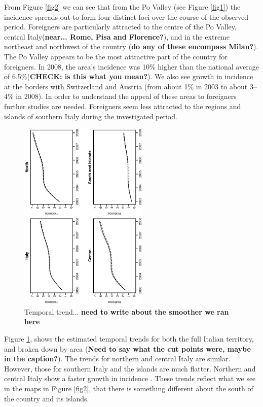\documentclass[10pt]{article}
\theoremstyle{definition}
\theoremstyle{plain}
\begin{document}
From Figure \ref{fig2} we can see that from the Po Valley (see Figure \ref{fig1}) the incidence spreads out to form four distinct foci over the course of the observed period. Foreigners are particularly attracted to the centre of the Po Valley, central Italy(\textbf{near... Rome, Pisa and Florence?}), and in the extreme northeast and northwest of the country (\textbf{do any of these encompass Milan?}). The Po Valley appears to be the most attractive part of the country for foreigners. In 2008, the area's incidence was 10\% higher than the national average of 6.5\%(\textbf{CHECK: is this what you mean?}). We also see growth in incidence at the borders with Switzerland and Austria (from about 1\% in 2003 to about 3--4\% in 2008). In order to understand the appeal of these areas to foreigners further studies are needed. Foreigners seem less attracted to the regions and islands of southern Italy during the investigated period.

\begin{figure}[tbp]
	\centering
		\includegraphics[width=0.55\textwidth, angle=270]{trends.ps}
	\caption{Temporal trend... \textbf{need to write about the smoother we ran here}}
	\label{trends}
\end{figure}

Figure \ref{trends}, shows the estimated temporal trends for both the full Italian territory, and broken down by area (\textbf{Need to say what the cut points were, maybe in the caption?}). The trends for northern and central Italy are similar. However, those for southern Italy and the islands are much flatter. Northern and central Italy show a faster growth in incidence . These trends reflect what we see in the maps in Figure \ref{fig2}, that there is something different about the south of the country and its islands.
\end{document}
